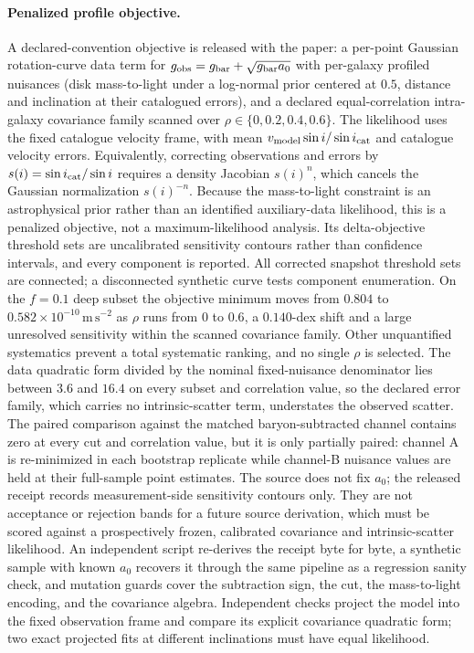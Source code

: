 \documentclass[11pt]{article}
\begin{document}
\paragraph{Penalized profile objective.}
A declared-convention objective is released with the paper: a per-point
Gaussian rotation-curve data term for
\(g_{\rm obs}=g_{\rm bar}+\sqrt{g_{\rm bar}a_0}\) with per-galaxy profiled
nuisances (disk mass-to-light under a log-normal prior centered at
\(0.5\), distance and inclination at their catalogued errors), and a declared
equal-correlation intra-galaxy covariance family scanned over
\(\rho\in\{0,0.2,0.4,0.6\}\). The likelihood uses the fixed catalogue
velocity frame, with mean \(v_{\rm model}\sin i/\sin i_{\rm cat}\) and
catalogue velocity errors. Equivalently, correcting observations and errors by
\(s(i)=\sin i_{\rm cat}/\sin i\) requires a density Jacobian
\(s(i)^n\), which cancels the Gaussian normalization \(s(i)^{-n}\).
Because the mass-to-light constraint is an
astrophysical prior rather than an identified auxiliary-data likelihood,
this is a penalized objective, not a maximum-likelihood analysis. Its
delta-objective threshold sets are uncalibrated sensitivity contours rather
than confidence intervals, and every component is reported. All corrected
snapshot threshold sets are connected; a disconnected synthetic curve tests
component enumeration. On
the \(f=0.1\) deep subset the objective minimum moves from \(0.804\) to
\(0.582\times10^{-10}\,\mathrm{m\,s^{-2}}\) as \(\rho\) runs from \(0\) to
\(0.6\), a \(0.140\)-dex shift and a large unresolved sensitivity within
the scanned covariance family. Other unquantified systematics prevent a total
systematic ranking, and no single \(\rho\) is selected. The data quadratic
form divided by the nominal fixed-nuisance denominator lies between \(3.6\)
and \(16.4\) on every subset and correlation value, so
the declared error family, which carries no intrinsic-scatter term,
understates the observed scatter. The paired comparison against the matched
baryon-subtracted channel contains zero at every cut and correlation value,
but it is only partially paired: channel A is re-minimized in each bootstrap
replicate while channel-B nuisance values are held at their full-sample point
estimates. The source does not fix \(a_0\); the released receipt records
measurement-side sensitivity contours only. They are not acceptance or
rejection bands for a future source derivation, which must be scored against a
prospectively frozen, calibrated covariance and intrinsic-scatter likelihood.
An independent script re-derives
the receipt byte for byte, a synthetic sample with known \(a_0\) recovers
it through the same pipeline as a regression sanity check, and mutation guards cover the subtraction
sign, the cut, the mass-to-light encoding, and the covariance algebra.
Independent checks project the model into the fixed observation frame and
compare its explicit covariance quadratic form; two exact projected fits at
different inclinations must have equal likelihood.
\end{document}
